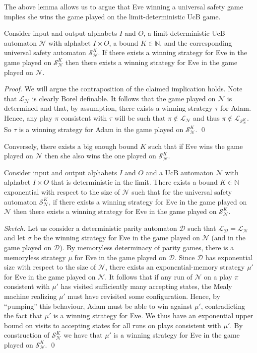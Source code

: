 \documentclass[draft]{llncs}
\newcommand{\eve}{Eve\xspace}
\newcommand{\adam}{Adam\xspace}
\newcommand{\calN}{\mathcal{N}}
\newcommand{\calS}{\mathcal{S}}
\newcommand{\calD}{\mathcal{D}}
\newcommand{\lang}[1]{\mathcal{L}_{#1}}
\begin{document}
The above lemma allows us to argue that \eve winning a universal safety game
implies she wins the game played on the limit-deterministic UcB game.
\begin{lemma}
    Consider input and output alphabets $I$ and $O$, a limit-deterministic UcB
    automaton $\calN$ with alphabet $I \times O$, a bound $K \in \mathbb{N}$,
    and the corresponding universal safety automaton $\calS^K_\calN$.  If there
    exists a winning strategy for \eve in the game played on $\calS^K_\calN$
    then there exists a winning strategy for \eve in the game played on
    $\calN$.
\end{lemma}
\begin{proof}
    We will argue the contraposition of the claimed implication holds.
    Note that $\lang{\calN}$ is clearly Borel definable. It follows that the
    game played on $\calN$ is determined and that, by assumption, there exists a
    winning strategy $\tau$ for \adam. Hence, any play $\pi$ consistent with
    $\tau$ will be such that $\pi \not\in \lang{\calN}$ and thus $\pi \not\in
    \lang{\calS^K_\calN}$. So $\tau$ is a winning strategy for \adam in the game
    played on $\calS^K_\calN$.
\qed\end{proof}

Conversely, there exists a big enough bound $K$ such that if \eve wins the game
played on $\calN$ then she also wins the one played on $\calS^K_\calN$.
%
\begin{lemma}
    Consider input and output alphabets $I$ and $O$ and a UcB
    automaton $\calN$ with alphabet $I \times O$ that is deterministic in the
    limit. There exists a bound $K \in
    \mathbb{N}$ exponential with respect to the size of $\calN$ such that for
    the universal safety automaton $\calS^K_\calN$, if there exists a winning
    strategy for \eve in the game played on $\calN$ then there exists a winning
    strategy for \eve in the game played on $\calS^K_\calN$.
\end{lemma}
\begin{proof}[Sketch]
    Let us consider a deterministic parity automaton $\calD$ such that
    $\lang{\calD} = \lang{\calN}$ and let $\sigma$ be the winning strategy for
    \eve in the game played on $\calN$ (and in the game played on $\calD$). By
    memoryless determinacy of parity games, there is a memoryless strategy $\mu$
    for \eve in the game played on $\calD$. Since $\calD$ has exponential size
    with respect to the size of $\calN$, there exists an exponential-memory
    strategy $\mu'$ for \eve in the game played on $\calN$. It follows that if
    any run of $\calN$ on a play $\pi$ consistent with $\mu'$ has visited
    sufficiently many accepting states, the Mealy machine realizing $\mu'$ must
    have revisited some configuration. Hence, by ``pumping'' this behaviour,
    \adam must be able to win against $\mu'$, contradicting the fact that $\mu'$
    is a winning strategy for \eve. We thus have an exponential upper bound on
    visits to accepting states for all runs on plays consistent with $\mu'$. By
    construction of $\calS^K_\calN$ we have that $\mu'$ is a winning strategy for
    \eve in the game played on $\calS^K_\calN$.
\qed\end{proof}
\end{document}
